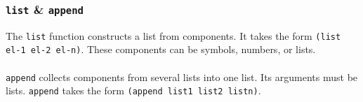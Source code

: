 \documentclass[a4paper,11pt]{article}
\begin{document}
\subsubsection{\texttt{list} \& \texttt{append}}
The \verb|list| function constructs a list from components. 
It takes the form \texttt{(list el-1 el-2 el-n)}. 
These components can be symbols, numbers, or lists.
\\\\
\verb|append| collects components from several lists into one list. 
Its arguments must be lists. 
\verb|append| takes the form \texttt{(append list1 list2 listn)}.
\end{document}
